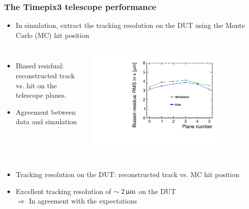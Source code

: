 \begin{frame}
  \frametitle{The Timepix3 telescope performance}

  \begin{itemize}
  \item In simulation, extract the tracking resolution on the DUT
    using the Monte Carlo (MC) hit position
  \end{itemize}

  \begin{columns}
    \begin{itemize}
    \item Biased residual: reconstructed track vs. hit on the
      telescope planes.
    \item Agreement between data and simulation 
    \end{itemize}

    \centering
    \includegraphics[width=0.8\textwidth]{../figures/Telescope/biasedResiduals/RMSX_simu_vs_data.pdf}
  \end{columns}

  \begin{columns}
    \begin{itemize}
    \item Tracking resolution on the DUT: reconstructed track vs. MC
      hit position
    \item Excellent tracking resolution of
      \textcolor{Green}{$\sim2\,\upmu\mathrm{m}$} on the DUT
      \\
      $\Rightarrow$ In agreement with the expectations 
    \end{itemize}


\end{columns}
\end{frame}
